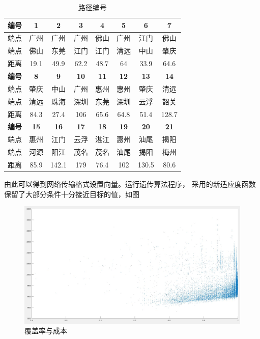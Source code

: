 \documentclass[UTF8,12pt]{ctexart}
\begin{document}
      \begin{table}[htbp]
        \centering
        \caption{路径编号}
        \begin{footnotesize}
            
          \begin{tabular}{cccccccc}
          \toprule
          \textbf{编号} & \textbf{1} & \textbf{2} & \textbf{3} & \textbf{4} & \textbf{5} & \textbf{6} & \textbf{7} \\
          \midrule
          端点     & 广州 & 广州 & 广州 & 佛山 & 广州 & 江门 & 佛山 \\
          \midrule
          端点     & 佛山 & 东莞 & 江门 & 江门 & 清远 & 中山 & 肇庆 \\
          \midrule
          距离     & 19.1   & 49.9   & 62.2   & 48.7   & 64     & 33.9   & 64.6 \\
          \midrule
          \textbf{编号} & \textbf{8} & \textbf{9} & \textbf{10} & \textbf{11} & \textbf{12} & \textbf{13} & \textbf{14} \\
          \midrule
          端点     & 肇庆 & 中山 & 广州 & 惠州 & 惠州 & 肇庆 & 清远 \\
          \midrule
          端点     & 清远 & 珠海 & 深圳 & 东莞 & 深圳 & 云浮 & 韶关 \\
          \midrule
          距离     & 84.3   & 27.4   & 106    & 65.6   & 64.8   & 51.4   & 128.7 \\
          \midrule
          \textbf{编号} & \textbf{15} & \textbf{16} & \textbf{17} & \textbf{18} & \textbf{19} & \textbf{20} & \textbf{21} \\
          \midrule
          端点     & 惠州 & 江门 & 云浮 & 湛江 & 惠州 & 汕尾 & 揭阳 \\
          \midrule
          端点     & 河源 & 阳江 & 茂名 & 茂名 & 汕尾 & 揭阳 & 梅州 \\
          \midrule
          距离     & 85.9   & 142.1  & 179    & 76.4   & 102    & 130.5  & 80.6 \\
          \bottomrule
          \end{tabular}%
        \end{footnotesize}
      \end{table}%
         由此可以得到网络传输格式设置向量。运行遗传算法程序，  
     采用的新适应度函数保留了大部分条件十分接近目标的值，如图
     \begin{figure}[H]
        \centering
        \includegraphics[scale=0.8]{cos.jpg}
        \caption{覆盖率与成本}
        \end{figure} 
\end{document}
